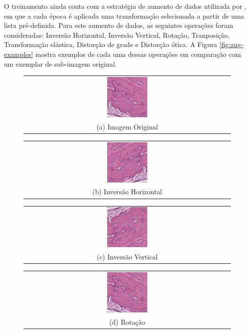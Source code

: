 O treinamento ainda conta com a estratégia de aumento de dados utilizada por \cite{Santos2023a}, em que a cada época é aplicada uma transformação selecionada a partir de uma lista pré-definida. Para este aumento de dados, as seguintes operações foram consideradas: Inversão Horizontal, Inversão Vertical, Rotação, Tranposição, Transformação elástica, Distorção de grade e Distorção ótica. A Figura \ref{fig:aug-examples} mostra exemplos de cada uma dessas operações em comparação com um exemplar de sub-imagem original.

\begin{figure}[h]
    \center
    \begin{tabular}{@{}c@{}}
        \includegraphics[width=0.2\textwidth]{figures/3_methods/transformations/205_r3c7.png}\\[\abovecaptionskip]
    \small (a) Imagem Original
    \end{tabular}
    \begin{tabular}{@{}c@{}}
        \includegraphics[width=0.2\textwidth]{figures/3_methods/transformations/205_r3c7_hflip.png}\\[\abovecaptionskip]
    \small (b) Inversão Horizontal
    \end{tabular}
    \begin{tabular}{@{}c@{}}
        \includegraphics[width=0.2\textwidth]{figures/3_methods/transformations/205_r3c7_vflip.png}\\[\abovecaptionskip]
    \small (c) Inversão Vertical
    \end{tabular}
    \begin{tabular}{@{}c@{}}
        \includegraphics[width=0.2\textwidth]{figures/3_methods/transformations/205_r3c7_rotation.png}\\[\abovecaptionskip]
    \small (d) Rotação
    \end{tabular}


\end{figure}

